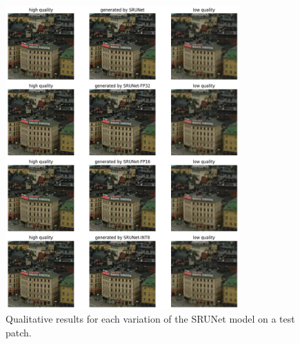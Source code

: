 \begin{figure}[ht]
\includegraphics[width=0.8\textwidth]{static/srunet_qualitative_results.png}
\caption{Qualitative results for each variation of the SRUNet model on a test patch.}
\label{fig:qualitative-srunet}
\end{figure}
